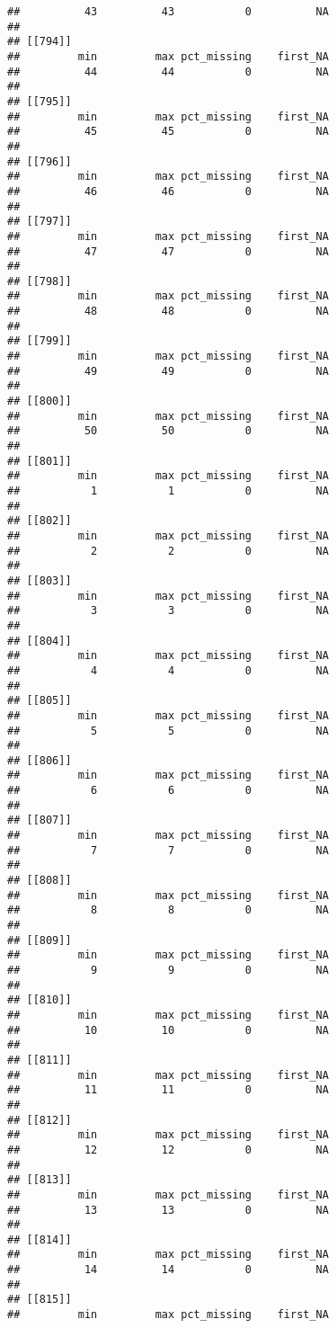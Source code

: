 \documentclass[
]{article}
\begin{document}
\begin{verbatim}
##          43          43           0          NA 
## 
## [[794]]
##         min         max pct_missing    first_NA 
##          44          44           0          NA 
## 
## [[795]]
##         min         max pct_missing    first_NA 
##          45          45           0          NA 
## 
## [[796]]
##         min         max pct_missing    first_NA 
##          46          46           0          NA 
## 
## [[797]]
##         min         max pct_missing    first_NA 
##          47          47           0          NA 
## 
## [[798]]
##         min         max pct_missing    first_NA 
##          48          48           0          NA 
## 
## [[799]]
##         min         max pct_missing    first_NA 
##          49          49           0          NA 
## 
## [[800]]
##         min         max pct_missing    first_NA 
##          50          50           0          NA 
## 
## [[801]]
##         min         max pct_missing    first_NA 
##           1           1           0          NA 
## 
## [[802]]
##         min         max pct_missing    first_NA 
##           2           2           0          NA 
## 
## [[803]]
##         min         max pct_missing    first_NA 
##           3           3           0          NA 
## 
## [[804]]
##         min         max pct_missing    first_NA 
##           4           4           0          NA 
## 
## [[805]]
##         min         max pct_missing    first_NA 
##           5           5           0          NA 
## 
## [[806]]
##         min         max pct_missing    first_NA 
##           6           6           0          NA 
## 
## [[807]]
##         min         max pct_missing    first_NA 
##           7           7           0          NA 
## 
## [[808]]
##         min         max pct_missing    first_NA 
##           8           8           0          NA 
## 
## [[809]]
##         min         max pct_missing    first_NA 
##           9           9           0          NA 
## 
## [[810]]
##         min         max pct_missing    first_NA 
##          10          10           0          NA 
## 
## [[811]]
##         min         max pct_missing    first_NA 
##          11          11           0          NA 
## 
## [[812]]
##         min         max pct_missing    first_NA 
##          12          12           0          NA 
## 
## [[813]]
##         min         max pct_missing    first_NA 
##          13          13           0          NA 
## 
## [[814]]
##         min         max pct_missing    first_NA 
##          14          14           0          NA 
## 
## [[815]]
##         min         max pct_missing    first_NA 

\end{verbatim}
\end{document}
